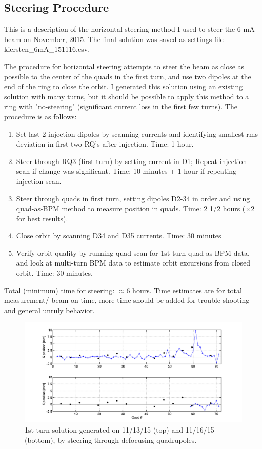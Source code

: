 \subsection{Steering Procedure}

This is a description of the horizontal steering method I used to steer the 6 mA beam on November, 2015. The final solution was saved as settings file kiersten\_6mA\_151116.csv.

The procedure for horizontal steering attempts to steer the beam as close as possible to the center of the quads in the first turn, and use two dipoles at the end of the ring to close the orbit. I generated this solution using an existing solution with many turns, but it should be possible to apply this method to a ring with "no-steering" (significant current loss in the first few turns).
The procedure is as follows:

\begin{enumerate}
\item Set last 2 injection dipoles by scanning currents and identifying smallest rms deviation in first two RQ's after injection. Time: 1 hour.
\item Steer through RQ3 (first turn) by setting current in D1; Repeat injection scan if change was significant. Time: 10 minutes + 1 hour if repeating injection scan.
\item Steer through quads in first turn, setting dipoles D2-34 in order and using quad-as-BPM method to measure position in quads. Time: 2 1/2 hours ($\times 2$ for best results).
\item Close orbit by scanning D34 and D35 currents.  Time: 30 minutes
\item Verify orbit quality by running quad scan for 1st turn quad-as-BPM data, and look at multi-turn BPM data to estimate orbit excursions from closed orbit. Time: 30 minutes.
\end{enumerate}

 Total (minimum) time for steering: $\approx 6$ hours. Time estimates are for total measurement/ beam-on time, more time should be added for trouble-shooting and general unruly behavior.
 
 
 
\begin{figure}[!h]
\includegraphics[width=\textwidth]{4.figures/quadscan_151113_151116.png}
\caption{1st turn solution generated on 11/13/15 (top) and 11/16/15 (bottom), by steering through defocusing quadrupoles.}
\label{fig:ring_steering}
\end{figure}


